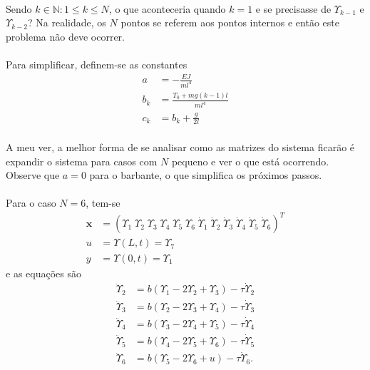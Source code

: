 \documentclass[a4paper,11pt]{scrartcl} %
\numberwithin{equation}{section} %
\numberwithin{figure}{section} %
\numberwithin{table}{section} %
\begin{document}
\paragraph{} Sendo $k\in \mathbb{N}:1\le k \le N$, o que aconteceria quando $k=1$ e se precisasse de $\Upsilon_{k-1}$ e $\Upsilon_{k-2}$? Na realidade, os $N$ pontos se referem aos pontos internos e então este problema não deve ocorrer.

\paragraph{} Para simplificar, definem-se as constantes \begin{align}
	a &= -\frac{EJ}{m l^4}\\
	b_k &= \frac{T_0 + mg(k-1)l}{m l^4}\\
	c_k &= b_k + \frac{g}{2l}
\end{align}

\paragraph{} A meu ver, a melhor forma de se analisar como as matrizes do sistema ficarão é expandir o sistema para casos com $N$ pequeno e ver o que está ocorrendo. Observe que $a=0$ para o barbante, o que simplifica os próximos passos.

\paragraph{} Para o caso $N=6$, tem-se \begin{align}
\mathbf{x} &= \left(\Upsilon_1\;\Upsilon_2\;\Upsilon_3\;\Upsilon_4\;\Upsilon_5\;\Upsilon_6\;\dot{\Upsilon}_1\;\dot{\Upsilon}_2\;\dot{\Upsilon}_3\;\dot{\Upsilon}_4\;\dot{\Upsilon}_5\;\dot{\Upsilon}_6\right)^T 	\\
u &= \Upsilon(L,t) = \Upsilon_7\label{ufor6}\\
y &= \Upsilon(0,t) = \Upsilon_1\label{yfor6}
 \end{align} e as equações são \begin{align}
 	\ddot{\Upsilon}_2 &=  b\left(\Upsilon_{1}-2\Upsilon_{2} + \Upsilon_{3}\right)-\tau \dot{\Upsilon}_2\\
 	\ddot{\Upsilon}_3 &=  b\left(\Upsilon_{2}-2\Upsilon_{3} + \Upsilon_{4}\right)-\tau \dot{\Upsilon}_3\\
 	\ddot{\Upsilon}_4 &=  b\left(\Upsilon_{3}-2\Upsilon_{4} + \Upsilon_{5}\right)-\tau \dot{\Upsilon}_4\\
 	\ddot{\Upsilon}_5 &=  b\left(\Upsilon_{4}-2\Upsilon_{5} + \Upsilon_{6}\right)-\tau \dot{\Upsilon}_5\\
 	\ddot{\Upsilon}_6 &=  b\left(\Upsilon_{5}-2\Upsilon_{6} + u\right)-\tau \dot{\Upsilon}_6.
 \end{align} 
 
\end{document}
